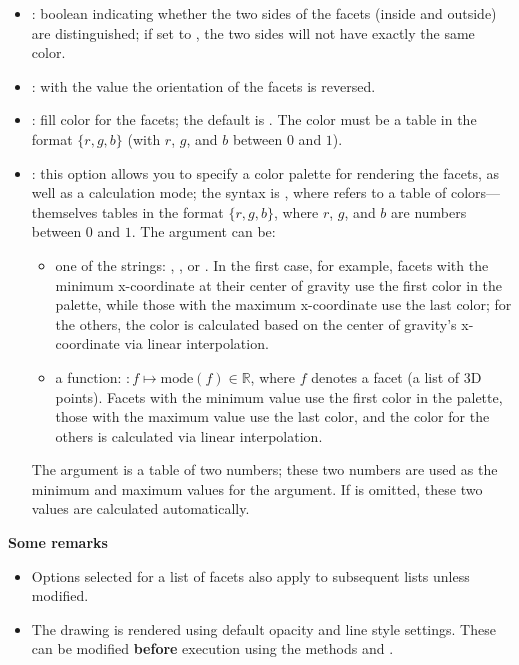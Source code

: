 \begin{itemize}
    \item {} : boolean indicating whether the two sides of the facets (inside and outside) are distinguished; if set to \true, the two sides will not have exactly the same color. 
    
    \item {} : with the value \true the orientation of the facets is reversed.

    \item {} : fill color for the facets; the default is . The color must be a table in the format $\{r,g,b\}$ (with $r$, $g$, and $b$ between $0$ and $1$).

    \item {} : this option allows you to specify a color palette for rendering the facets, as well as a calculation mode; the syntax is , where  refers to a table of colors—themselves tables in the format $\{r,g,b\}$, where $r$, $g$, and $b$ are numbers between $0$ and $1$. The  argument can be:
    \begin{itemize}
        \item one of the strings: , , or . In the first case, for example, facets with the minimum x-coordinate at their center of gravity use the first color in the palette, while those with the maximum x-coordinate use the last color; for the others, the color is calculated based on the center of gravity's x-coordinate via linear interpolation. 

        \item a function: $\colon f \mapsto \mathrm{mode}(f)\in\mathbb R$, where $f$ denotes a facet (a list of 3D points). Facets with the minimum value use the first color in the palette, those with the maximum value use the last color, and the color for the others is calculated via linear interpolation. 
    \end{itemize}
    The  argument is a table of two numbers; these two numbers are used as the minimum and maximum values ​​for the  argument. If  is omitted, these two values ​​are calculated automatically.
\end{itemize}

\textbf{Some remarks}
\begin{itemize}
    \item Options selected for a list of facets also apply to subsequent lists unless modified. 
    \item The drawing is rendered using default opacity and line style settings. These can be modified \textbf{before} execution using the methods  and .
\end{itemize}

